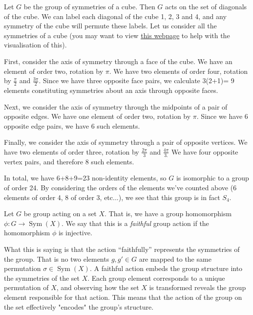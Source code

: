 \begin{example} 
  Let $G$ be the group of symmetries of a cube. Then $G$ acts on the set of diagonals of the cube. We can label each diagonal of the cube 1, 2, 3 and 4, and any symmetry of the cube will permute these labels. Let us consider all the symmetries of a cube (you may want to view \href{https://www.geogebra.org/m/CytXh7eW}{this webpage} to help with the visualisation of this). 
  
  First, consider the axis of symmetry through a face of the cube. We have an element of order two, rotation by $\pi$. We have two elements of order four, rotation by $\frac{\pi}{2}$ and $\frac{3\pi}{2}.$ Since we have three opposite face pairs, we calculate 3(2+1)= 9 elements constituting symmetries about an axis through opposite faces.
  
  Next, we consider the axis of symmetry through the midpoints of a pair of opposite edges. We have one element of order two, rotation by $\pi.$ Since we have 6 opposite edge pairs, we have 6 such elements. 
  
  Finally, we consider the axis of symmetry through a pair of opposite vertices. We have two elements of order three, rotation by $\frac{2\pi}{3}$ and $\frac{4\pi}{3.}$ We have four opposite vertex pairs, and therefore 8 such elements.
  
  In total, we have 6+8+9=23 non-identity elements, so $G$ is isomorphic to a group of order 24. By considering the orders of the elements we've counted above (6 elements of order 4, 8 of order 3, etc...), we see that this group is in fact $S_4.$  
  
\end{example}
\begin{definition}
    Let $G$ be group acting on a set $X$. That is, we have a group homomorphism $\phi: G \rightarrow \operatorname{Sym}(X)$. We say that this is a \emph{faithful} group action if the homomorphism $\phi$ is injective. \label{def:faithfulAction}
\end{definition}

What this is saying is that the action ``faithfully'' represents the symmetries of the group. That is no two elements $g,g' \in G$ are mapped to the same permutation $\sigma \in \operatorname{Sym}(X).$ A faithful action embeds the group structure into the symmetries of the set $X$. Each group element corresponds to a unique permutation of $X$, and observing how the set $X$ is transformed reveals the group element responsible for that action. This means that the action of the group on the set effectively "encodes" the group's structure.

